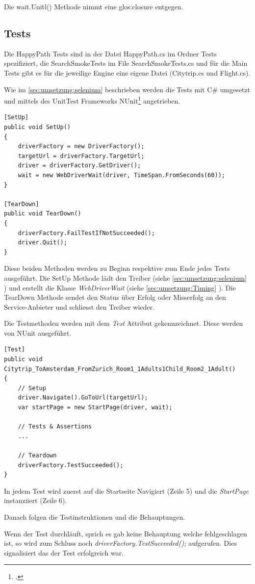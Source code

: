 Die wait.Unitl() Methode nimmt eine \Gls{glos:closure} entgegen.

\subsection{Tests}
Die HappyPath Tests sind in der Datei HappyPath.cs im Ordner Tests spezifiziert, die SearchSmokeTests im File SearchSmokeTests.cs und für die Main Tests gibt es für die jeweilige Engine eine eigene Datei (Citytrip.cs und Flight.cs).


Wie im \cref{sec:umsetzung:selenium}  beschrieben werden die Tests mit C\# umgesetzt und mittels des UnitTest Frameworks NUnit\footcite{NUnit_-_Home_2015-09-26} angetrieben.

\begin{lstlisting}
[SetUp]
public void SetUp()
{
    driverFactory = new DriverFactory();
    targetUrl = driverFactory.TargetUrl;
    driver = driverFactory.GetDriver();
    wait = new WebDriverWait(driver, TimeSpan.FromSeconds(60));
}

[TearDown]
public void TearDown()
{
    driverFactory.FailTestIfNotSucceeded();
    driver.Quit();
}
\end{lstlisting}

Diese beiden Methoden werden zu Beginn respektive zum Ende jedes Tests ausgeführt. Die SetUp Methode lädt den Treiber (siehe \cref{sec:umsetzung:selenium} ) und erstellt die Klasse \textit{WebDriverWait} (siehe \cref{sec:umsetzung:Timing} ). Die TearDown Methode sendet den Status über Erfolg oder Misserfolg an den Service-Anbieter und schliesst den Treiber wieder.

Die Testmethoden werden mit dem \textit{Test} Attribut gekennzeichnet. Diese werden von NUnit ausgeführt.

\begin{lstlisting}
[Test]
public void Citytrip_ToAmsterdam_FromZurich_Room1_1Adults1Child_Room2_1Adult()
{
	// Setup
	driver.Navigate().GoToUrl(targetUrl);
	var startPage = new StartPage(driver, wait);
	
	// Tests & Assertions
	...
	
	// Teardown
	driverFactory.TestSucceeded();
}
\end{lstlisting}

In jedem Test wird zuerst auf die Startseite Navigiert (Zeile 5) und die \textit{StartPage} instanziiert (Zeile 6).

Danach folgen die Testinstruktionen und die Behauptungen.

Wenn der Test durchläuft, sprich es gab keine Behauptung welche fehlgeschlagen ist, so wird zum Schluss noch \textit{driverFactory.TestSucceeded();} aufgerufen. Dies signalisiert das der Test erfolgreich war.